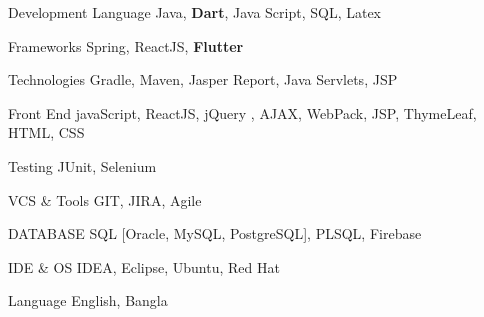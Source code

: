 




\begin{cvskills}
	
	\cvskill
	{Development Language} %
	{Java, \textbf{Dart}, Java Script, SQL, Latex} %
	
	
	\cvskill
	{Frameworks} %
	{Spring, ReactJS, \textbf{Flutter} } %
	
	\cvskill
	{Technologies} %
	{Gradle, Maven, Jasper Report, Java Servlets, JSP} %
	
	\cvskill
	{Front End} %
	{javaScript, ReactJS, jQuery , AJAX, WebPack, JSP, ThymeLeaf, HTML, CSS} %
	
	\cvskill
	{Testing} %
	{JUnit, Selenium} %
	
	\cvskill
	{VCS \&  Tools} %
	{GIT, JIRA, Agile} %
	
	\cvskill
	{DATABASE} %
	{SQL [Oracle, MySQL, PostgreSQL], PLSQL, Firebase} %
	
	
	\cvskill
	{IDE \& OS} %
	{IDEA, Eclipse, Ubuntu, Red Hat} %
	
	
	
	\cvskill
	{Language} %
	{English, Bangla} %
	
\end{cvskills}
